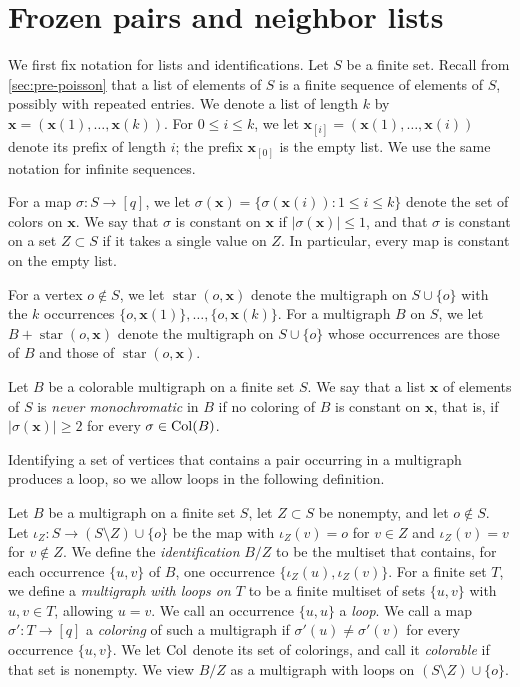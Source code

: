 \section{Frozen pairs and neighbor lists}\label{sec:low-frozen}

We first fix notation for lists and identifications. Let $S$ be a finite set. Recall from \cref{sec:pre-poisson} that a list of elements of $S$ is a finite sequence of elements of $S$, possibly with repeated entries. We denote a list of length $k$ by $\mathbf x = (\mathbf x(1), \dots, \mathbf x(k))$. For $0 \le i \le k$, we let $\mathbf x_{[i]} = (\mathbf x(1), \dots, \mathbf x(i))$ denote its prefix of length $i$; the prefix $\mathbf x_{[0]}$ is the empty list. We use the same notation for infinite sequences.

For a map $\sigma \colon S \to [q]$, we let $\sigma(\mathbf x) = \{\sigma(\mathbf x(i)) : 1 \le i \le k\}$ denote the set of colors on $\mathbf x$. We say that $\sigma$ is constant on $\mathbf x$ if $|\sigma(\mathbf x)| \le 1$, and that $\sigma$ is constant on a set $Z \subset S$ if it takes a single value on $Z$. In particular, every map is constant on the empty list.

For a vertex $o \notin S$, we let $\operatorname{star}(o, \mathbf x)$ denote the multigraph on $S \cup \{o\}$ with the $k$ occurrences $\{o, \mathbf x(1)\}, \dots, \{o, \mathbf x(k)\}$. For a multigraph $B$ on $S$, we let $B + \operatorname{star}(o, \mathbf x)$ denote the multigraph on $S \cup \{o\}$ whose occurrences are those of $B$ and those of $\operatorname{star}(o, \mathbf x)$.

\begin{definition}\label{def:low-nm}
Let $B$ be a colorable multigraph on a finite set $S$. We say that a list $\mathbf x$ of elements of $S$ is \emph{never monochromatic} in $B$ if no coloring of $B$ is constant on $\mathbf x$, that is, if $|\sigma(\mathbf x)| \ge 2$ for every $\sigma \in \operatorname{Col}(B)$.
\end{definition}

Identifying a set of vertices that contains a pair occurring in a multigraph produces a loop, so we allow loops in the following definition.

\begin{definition}\label{def:low-identification}
Let $B$ be a multigraph on a finite set $S$, let $Z \subset S$ be nonempty, and let $o \notin S$. Let $\iota_Z \colon S \to (S \setminus Z) \cup \{o\}$ be the map with $\iota_Z(v) = o$ for $v \in Z$ and $\iota_Z(v) = v$ for $v \notin Z$. We define the \emph{identification} $B/Z$ to be the multiset that contains, for each occurrence $\{u, v\}$ of $B$, one occurrence $\{\iota_Z(u), \iota_Z(v)\}$. For a finite set $T$, we define a \emph{multigraph with loops on $T$} to be a finite multiset of sets $\{u, v\}$ with $u, v \in T$, allowing $u = v$. We call an occurrence $\{u, u\}$ a \emph{loop}. We call a map $\sigma'\colon T \to [q]$ a \emph{coloring} of such a multigraph if $\sigma'(u) \ne \sigma'(v)$ for every occurrence $\{u, v\}$. We let $\operatorname{Col}$ denote its set of colorings, and call it \emph{colorable} if that set is nonempty. We view $B/Z$ as a multigraph with loops on $(S \setminus Z) \cup \{o\}$.
\end{definition}

